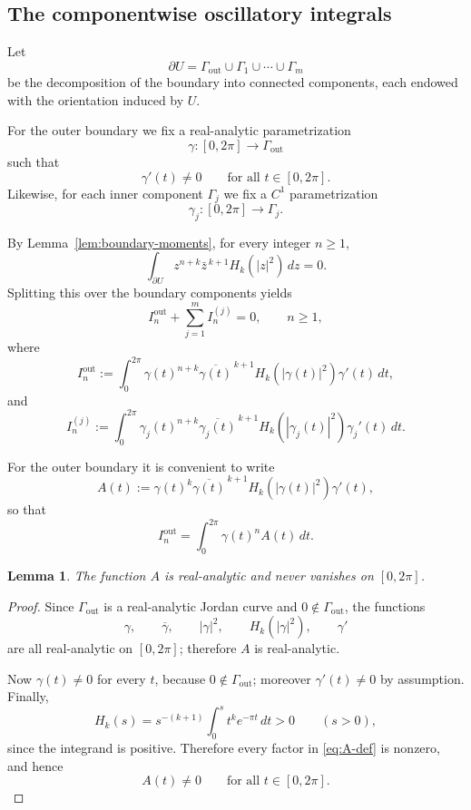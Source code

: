 \documentclass[11pt]{amsart}
\newtheorem{lemma}[theorem]{Lemma}
\theoremstyle{remark}
\newcommand{\1}{\mathbf 1}
\begin{document}
\subsection{The componentwise oscillatory integrals}

Let
\[
\partial U=\Gamma_{\mathrm{out}}\cup\Gamma_1\cup\cdots\cup\Gamma_m
\]
be the decomposition of the boundary into connected components, each endowed
with the orientation induced by $U$.

For the outer boundary we fix a real-analytic parametrization
\[
\gamma:[0,2\pi]\to \Gamma_{\mathrm{out}}
\]
such that
\[
\gamma'(t)\neq 0
\qquad\text{for all }t\in[0,2\pi].
\]
Likewise, for each inner component $\Gamma_j$ we fix a $C^1$ parametrization
\[
\gamma_j:[0,2\pi]\to \Gamma_j.
\]

By Lemma~\ref{lem:boundary-moments}, for every integer $n\ge 1$,
\[
\int_{\partial U} z^{n+k}\bar z^{\,k+1}H_k(|z|^2)\,dz=0.
\]
Splitting this over the boundary components yields
\begin{equation}\label{eq:split-boundary}
I_n^{\mathrm{out}}+\sum_{j=1}^m I_n^{(j)}=0,
\qquad n\ge 1,
\end{equation}
where
\begin{equation}\label{eq:I-out}
I_n^{\mathrm{out}}
:=
\int_0^{2\pi}
\gamma(t)^{n+k}\overline{\gamma(t)}^{\,k+1}
H_k(|\gamma(t)|^2)\gamma'(t)\,dt,
\end{equation}
and
\begin{equation}\label{eq:I-inner}
I_n^{(j)}
:=
\int_0^{2\pi}
\gamma_j(t)^{n+k}\overline{\gamma_j(t)}^{\,k+1}
H_k(|\gamma_j(t)|^2)\gamma_j'(t)\,dt.
\end{equation}

For the outer boundary it is convenient to write
\begin{equation}\label{eq:A-def}
A(t):=\gamma(t)^k\overline{\gamma(t)}^{\,k+1}
H_k(|\gamma(t)|^2)\gamma'(t),
\end{equation}
so that
\begin{equation}\label{eq:I-out-short}
I_n^{\mathrm{out}}=\int_0^{2\pi}\gamma(t)^n A(t)\,dt.
\end{equation}

\begin{lemma}\label{lem:A-nonzero}
The function $A$ is real-analytic and never vanishes on $[0,2\pi]$.
\end{lemma}

\begin{proof}
Since $\Gamma_{\mathrm{out}}$ is a real-analytic Jordan curve and $0\notin\Gamma_{\mathrm{out}}$, the functions
\[
\gamma,\qquad \overline{\gamma},\qquad |\gamma|^2,\qquad H_k(|\gamma|^2),\qquad \gamma'
\]
are all real-analytic on $[0,2\pi]$; therefore $A$ is real-analytic.

Now $\gamma(t)\neq 0$ for every $t$, because $0\notin \Gamma_{\mathrm{out}}$; moreover $\gamma'(t)\neq 0$ by assumption. Finally,
\[
H_k(s)=s^{-(k+1)}\int_0^s t^k e^{-\pi t}\,dt>0
\qquad (s>0),
\]
since the integrand is positive. Therefore every factor in \eqref{eq:A-def} is nonzero, and hence
\[
A(t)\neq 0
\qquad\text{for all }t\in[0,2\pi].
\]
\end{proof}
\end{document}
